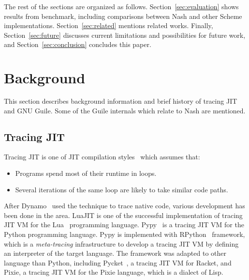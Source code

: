 \documentclass[preprint, 10pt]{sigplanconf}
\begin{document}
The rest of the sections are organized as follows.
Section~\hyperref[sec:evaluation]{\ref{sec:evaluation}} shows results from
benchmark, including comparisons between Nash and other Scheme
implementations. Section~\hyperref[sec:related]{\ref{sec:related}} mentions
related works. Finally, Section~\hyperref[sec:conclusion]{\ref{sec:future}}
discusses current limitations and possibilities for future work, and
Section~\hyperref[sec:conclusion]{\ref{sec:conclusion}} concludes this paper.

\section{Background}
\label{sec:background}

This section describes background information and brief history of tracing JIT
and GNU Guile. Some of the Guile internals which relate to Nash are mentioned.

\subsection{Tracing JIT}
Tracing JIT is one of JIT compilation styles~\cite{bolz2009tracing} which
assumes that:

\begin{itemize}
\item Programs spend most of their runtime in loops.
\item Several iterations of the same loop are likely to take similar code
  paths.
\end{itemize}

After Dynamo~\cite{bala2000dynamo} used the technique to trace native code,
various development has been done in the area. LuaJIT is one of the successful
implementation of tracing JIT VM for the Lua~\cite{ierusalimschy1996lua}
programming language. Pypy~\cite{bolz2009tracing} is a tracing JIT VM for the
Python programming language. Pypy is implemented with
RPython~\cite{bolz2009tracing} framework, which is a \textit{meta-tracing}
infrastructure to develop a tracing JIT VM by defining an interpreter of the
target language. The framework was adapted to other language than Python,
including Pycket~\citep{bauman2015pycket}, a tracing JIT VM for Racket, and
Pixie, a tracing JIT VM for the Pixie language, which is a dialect of Lisp.
\end{document}
